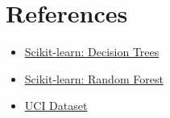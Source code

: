 \documentclass[11pt]{article}
\begin{document}

\section*{References}
\begin{itemize}
    \item \href{https://scikit-learn.org/stable/modules/tree.html}{Scikit-learn: Decision Trees}
    \item \href{https://scikit-learn.org/stable/modules/ensemble.html}{Scikit-learn: Random Forest}
    \item \href{https://archive.ics.uci.edu/dataset/17/breast+cancer+wisconsin+diagnostic}{UCI Dataset}
\end{itemize}
\end{document}
